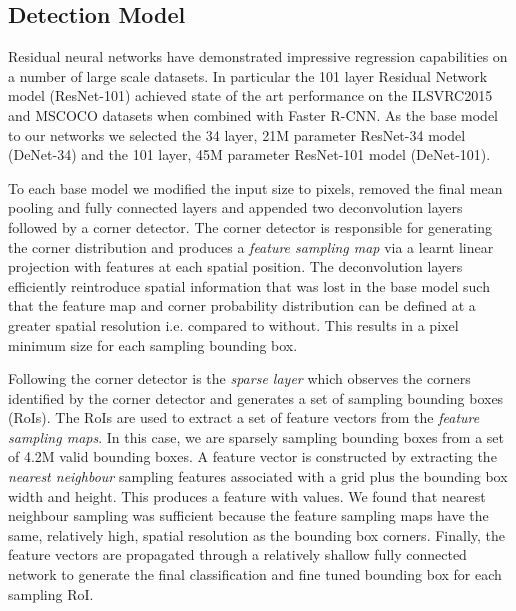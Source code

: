 \documentclass[10pt,twocolumn]{article}
\begin{document}
\newpage


\subsection{Detection Model} \label{sec:model}

Residual neural networks \cite{resnet} have demonstrated impressive regression capabilities on a number of large scale datasets. In particular the 101 layer Residual Network model (ResNet-101) achieved state of the art performance on the ILSVRC2015\cite{imagenet} and MSCOCO\cite{mscoco} datasets when combined with Faster R-CNN. As the base model to our networks we selected the 34 layer, 21M parameter ResNet-34 model (DeNet-34) and the 101 layer, 45M parameter ResNet-101 model (DeNet-101).



To each base model we modified the input size to  pixels, removed the final mean pooling and fully connected layers and appended two deconvolution\cite{deconv} layers followed by a corner detector. The corner detector is responsible for generating the corner distribution and produces a \textit{feature sampling map} via a learnt linear projection with  features at each spatial position. The deconvolution\cite{deconv} layers efficiently reintroduce spatial information that was lost in the base model such that the feature map and corner probability distribution can be defined at a greater spatial resolution i.e.  compared to  without. This results in a  pixel minimum size for each sampling bounding box.

Following the corner detector is the \textit{sparse layer} which observes the corners identified by the corner detector and generates a set of sampling bounding boxes (RoIs). The RoIs are used to extract a set of  feature vectors from the \textit{feature sampling maps}. In this case, we are sparsely sampling  bounding boxes from a set of 4.2M valid bounding boxes. A feature vector is constructed by extracting the \textit{nearest neighbour} sampling features associated with a  grid plus the bounding box width and height. This produces a feature with  values. We found that nearest neighbour sampling was sufficient because the feature sampling maps have the same, relatively high, spatial resolution as the bounding box corners. Finally, the feature vectors are propagated through a relatively shallow fully connected network to generate the final classification and fine tuned bounding box for each sampling RoI. 
\end{document}
